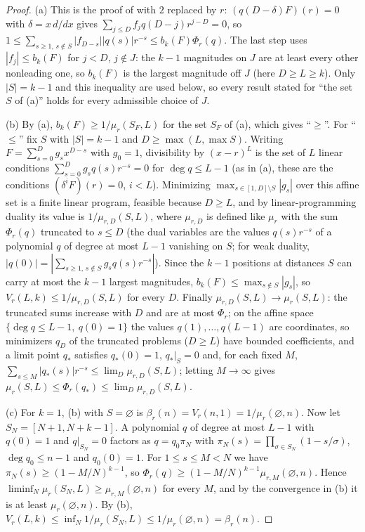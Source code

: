 \documentclass[11pt]{article}
\begin{document}
\begin{proof}
(a) This is the proof of \cite[Lemma~5.1]{coefficient-mass} with $2$ replaced by $r$:
$(q(D-\delta)F)(r)=0$ with $\delta=x\,d/dx$ gives
$\sum_{j\le D}f_jq(D-j)r^{j-D}=0$, so
$1\le\sum_{s\ge1,\,s\notin S}|f_{D-s}||q(s)|r^{-s}\le b_k(F)\Phi_r(q)$.
The last step uses $|f_j|\le b_k(F)$ for $j<D$, $j\notin J$: the $k-1$
magnitudes on $J$ are at least every other nonleading one, so $b_k(F)$ is
the largest magnitude off $J$ (here $D\ge L\ge k$).  Only $|S|=k-1$ and
this inequality are used below, so every result stated for ``the set $S$
of (a)'' holds for every admissible choice of $J$.

(b) By (a), $b_k(F)\ge1/\mu_r(S_F,L)$ for the set $S_F$ of (a), which
gives ``$\ge$''.  For ``$\le$'' fix $S$ with $|S|=k-1$ and $D\ge\max(L,\max S)$.
Writing $F=\sum_{s=0}^Dg_sx^{D-s}$ with $g_0=1$, divisibility by
$(x-r)^L$ is the set of $L$ linear conditions
$\sum_{s=0}^Dg_sq(s)r^{-s}=0$ for $\deg q\le L-1$ (as in (a), these are the
conditions $(\delta^iF)(r)=0$, $i<L$).  Minimizing
$\max_{s\in[1,D]\setminus S}|g_s|$ over this affine set is a finite linear
program, feasible because $D\ge L$, and by linear-programming duality its value is
$1/\mu_{r,D}(S,L)$, where $\mu_{r,D}$ is defined like $\mu_r$ with the sum
$\Phi_r(q)$ truncated to $s\le D$ (the dual variables are the values
$q(s)r^{-s}$ of a polynomial $q$ of degree at most $L-1$ vanishing on $S$;
for weak duality, $|q(0)|=|\sum_{s\ge1,\,s\notin S}g_sq(s)r^{-s}|$).  Since
the $k-1$ positions at distances $S$ can carry at most the $k-1$ largest
magnitudes, $b_k(F)\le\max_{s\notin S}|g_s|$, so
$V_r(L,k)\le1/\mu_{r,D}(S,L)$ for every $D$.  Finally
$\mu_{r,D}(S,L)\to\mu_r(S,L)$: the truncated sums increase with $D$ and
are at most $\Phi_r$; on the affine space $\{\deg q\le L-1,\ q(0)=1\}$ the
values $q(1),\ldots,q(L-1)$ are coordinates, so minimizers $q_D$ of the
truncated problems ($D\ge L$) have bounded coefficients, and a limit point
$q_*$ satisfies $q_*(0)=1$, $q_*|_S=0$ and, for each fixed $M$,
$\sum_{s\le M}|q_*(s)|r^{-s}\le\lim_D\mu_{r,D}(S,L)$; letting $M\to\infty$
gives $\mu_r(S,L)\le\Phi_r(q_*)\le\lim_D\mu_{r,D}(S,L)$.

(c) For $k=1$, (b) with $S=\varnothing$ is $\beta_r(n)=V_r(n,1)=1/\mu_r(\varnothing,n)$.
Now let $S_N=[N+1,N+k-1]$.  A polynomial $q$ of degree at most $L-1$ with
$q(0)=1$ and $q|_{S_N}=0$ factors as $q=q_0\pi_N$ with
$\pi_N(s)=\prod_{\sigma\in S_N}(1-s/\sigma)$, $\deg q_0\le n-1$ and
$q_0(0)=1$.  For $1\le s\le M<N$ we have $\pi_N(s)\ge(1-M/N)^{k-1}$, so
$\Phi_r(q)\ge(1-M/N)^{k-1}\mu_{r,M}(\varnothing,n)$.  Hence
$\liminf_N\mu_r(S_N,L)\ge\mu_{r,M}(\varnothing,n)$ for every $M$, and by
the convergence in (b) it is at least $\mu_r(\varnothing,n)$.  By (b),
$V_r(L,k)\le\inf_N1/\mu_r(S_N,L)\le1/\mu_r(\varnothing,n)=\beta_r(n)$.
\end{proof}
\end{document}
